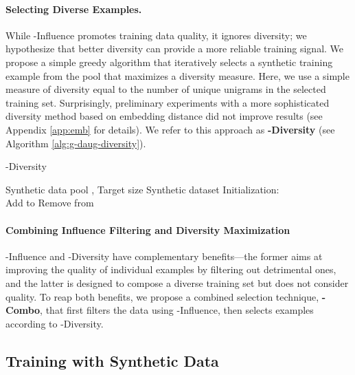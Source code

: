 \documentclass[11pt,a4paper]{article}
\newcommand{\gdaug}{}
\begin{document}
\paragraph{Selecting Diverse Examples.} 
While \gdaug-Influence promotes training data quality, it ignores diversity; we hypothesize that better diversity can provide a more reliable training signal. 
We propose a simple greedy algorithm that iteratively selects a synthetic training example from the pool that maximizes a diversity measure.  Here, we use a simple measure of diversity equal to the number of unique unigrams in the selected training set.  Surprisingly, preliminary experiments with a more sophisticated diversity method based on embedding distance did not improve results (see Appendix \ref{app:emb} for details).
We refer to this approach as \textbf{\gdaug-Diversity} (see Algorithm \ref{alg:g-daug-diversity}).
 \begin{algorithm}[H]
   \caption{\gdaug-Diversity}
   \label{alg:g-daug-diversity}
 \begin{algorithmic}
    Synthetic data pool , Target size 
    Synthetic dataset 
       \STATE Initialization:  
     \REPEAT
     \STATE  \\
     \hspace{0.7in}
     \STATE Add  to 
     \STATE Remove  from 
  \UNTIL{ }
 \end{algorithmic}
 \end{algorithm}


\paragraph{Combining Influence Filtering and Diversity Maximization}
\gdaug-Influence and \gdaug-Diversity have complementary benefits---the former aims at improving the quality of individual examples by filtering out detrimental ones, and the latter is designed to compose a diverse training set but does not consider quality.  To reap both benefits, we propose a combined selection technique, \textbf{\gdaug-Combo}, that first filters the data using \gdaug-Influence, then selects examples according to \gdaug-Diversity. 


 \subsection{ Training with Synthetic Data}
\label{sec:data-aug:training}
\end{document}
